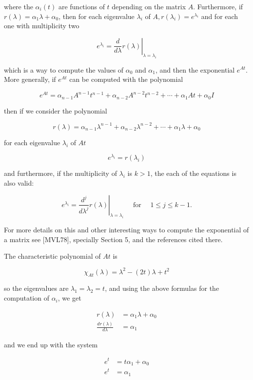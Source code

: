 \documentclass[10pt]{article}
\begin{document}
where the $\alpha_{i}(t)$ are functions of $t$ depending on the matrix $A$. Furthermore, if $r(\lambda)=\alpha_{1} \lambda+\alpha_{0}$, then for each eigenvalue $\lambda_{i}$ of $A, r\left(\lambda_{i}\right)=e^{\lambda_{i}}$ and for each one with multiplicity two

$$
e^{\lambda_{i}}=\left.\frac{d}{d \lambda} r(\lambda)\right|_{\lambda=\lambda_{i}}
$$

which is a way to compute the values of $\alpha_{0}$ and $\alpha_{1}$, and then the exponential $e^{A t}$. More generally, if $e^{A t}$ can be computed with the polynomial

$$
e^{A t}=\alpha_{n-1} A^{n-1} t^{n-1}+\alpha_{n-2} A^{n-2} t^{n-2}+\cdots+\alpha_{1} A t+\alpha_{0} I
$$

then if we consider the polynomial

$$
r(\lambda)=\alpha_{n-1} \lambda^{n-1}+\alpha_{n-2} \lambda^{n-2}+\cdots+\alpha_{1} \lambda+\alpha_{0}
$$

for each eigenvalue $\lambda_{i}$ of $A t$

$$
e^{\lambda_{i}}=r\left(\lambda_{i}\right)
$$

and furthermore, if the multiplicity of $\lambda_{i}$ is $k>1$, the each of the equations is also valid:

$$
e^{\lambda_{i}}=\left.\frac{d^{j}}{d \lambda^{j}} r(\lambda)\right|_{\lambda=\lambda_{i}} \quad \text { for } \quad 1 \leqslant j \leqslant k-1 .
$$

For more details on this and other interesting ways to compute the exponential of a matrix see [MVL78], specially Section 5, and the references cited there.

The characteristic polynomial of $A t$ is

$$
\chi_{A t}(\lambda)=\lambda^{2}-(2 t) \lambda+t^{2}
$$

so the eigenvalues are $\lambda_{1}=\lambda_{2}=t$, and using the above formulas for the computation of $\alpha_{i}$, we get

$$
\begin{aligned}
r(\lambda) &=\alpha_{1} \lambda+\alpha_{0} \\
\frac{d r(\lambda)}{d \lambda} &=\alpha_{1}
\end{aligned}
$$

and we end up with the system

$$
\begin{aligned}
e^{t} &=t \alpha_{1}+\alpha_{0} \\
e^{t} &=\alpha_{1}
\end{aligned}
$$
\end{document}
